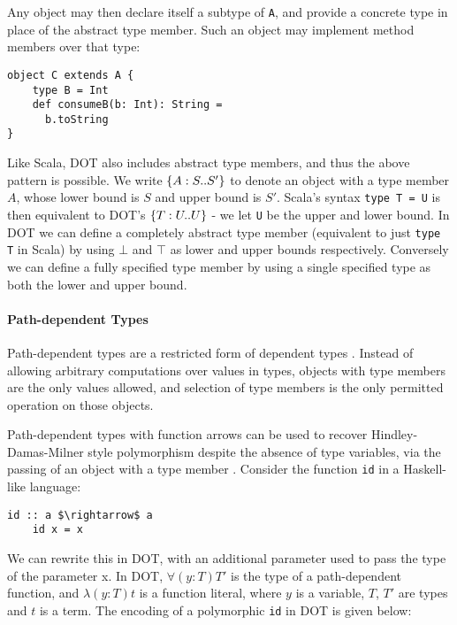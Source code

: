 \noindent Any object may then declare itself a subtype of \texttt{A}, and
provide a concrete type in place of the abstract type member. Such an object may
implement method members over that type:

\begin{minipage}{\linewidth}
\begin{lstlisting}[mathescape]
object C extends A {
    type B = Int
    def consumeB(b: Int): String =
      b.toString
}
\end{lstlisting}
\end{minipage}

\noindent Like Scala, DOT also includes abstract type members, and thus the
above pattern is possible. We write $\{A : S .. S'\}$ to denote an object with a
type member $A$, whose lower bound is $S$ and upper bound is $S'$. Scala's
syntax \texttt{type T = U} is then equivalent to DOT's $\{T : U .. U\}$ - we let
\texttt{U} be the upper and lower bound. In DOT we can define a completely
abstract type member (equivalent to just \texttt{type T} in Scala) by using
$\bot$ and $\top$ as lower and upper bounds respectively. Conversely we can
define a fully specified type member by using a single specified type as both
the lower and upper bound.

\paragraph{Path-dependent Types}
Path-dependent types are a restricted form of dependent types \cite{AGORS16}.
Instead of allowing arbitrary computations over values in types, objects with
type members are the only values allowed, and selection of type members is the
only permitted operation on those objects.

Path-dependent types with function arrows can be used to recover
Hindley-Damas-Milner style polymorphism despite the absence of type variables,
via the passing of an object with a type member \cite{AGORS16}. Consider the
function \texttt{id} in a Haskell-like language:

\begin{minipage}{\linewidth}
\begin{lstlisting}[mathescape]
    id :: a $\rightarrow$ a
    id x = x
\end{lstlisting}
\end{minipage}

\noindent We can rewrite this in DOT, with an additional parameter used to pass
the type of the parameter x. In DOT, $\forall(y: T)T'$ is the type of a
path-dependent function, and $\lambda(y: T)t$ is a function literal, where $y$
is a variable, $T$, $T'$ are types and $t$ is a term. The encoding of a
polymorphic \texttt{id} in DOT is given below:

